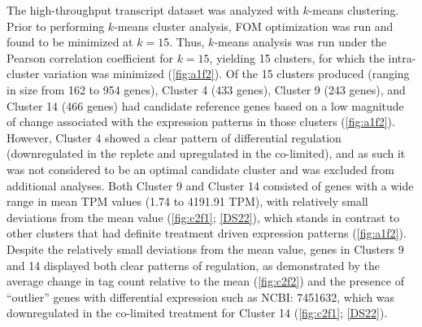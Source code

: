 The high-throughput transcript dataset was analyzed with $k$-means clustering. Prior to performing $k$-means cluster analysis, FOM optimization was run and found to be minimized at $k=1$5. Thus, $k$-means analysis was run under the Pearson correlation coefficient for $k=15$, yielding 15 clusters, for which the intra-cluster variation was minimized (\cref{fig:a1f2}). Of the 15 clusters produced (ranging in size from 162 to 954 genes), Cluster 4 (433 genes), Cluster 9 (243 genes), and Cluster 14 (466 genes) had candidate reference genes based on a low magnitude of change associated with the expression patterns in those clusters (\cref{fig:a1f2}). However, Cluster 4 showed a clear pattern of differential regulation (downregulated in the replete and upregulated in the co-limited), and as such it was not considered to be an optimal candidate cluster and was excluded from additional analyses. Both Cluster 9 and Cluster 14 consisted of genes with a wide range in mean TPM values (1.74 to 4191.91 TPM), with relatively small deviations from the mean value (\cref{fig:c2f1}; \ref{DS22}), which stands in contrast to other clusters that had definite treatment driven expression patterns (\cref{fig:a1f2}). Despite the relatively small deviations from the mean value, genes in Clusters 9 and 14 displayed both clear patterns of regulation, as demonstrated by the average change in tag count relative to the mean (\cref{fig:c2f2}) and the presence of ``outlier'' genes with differential expression such as NCBI: 7451632, which was downregulated in the co-limited treatment for Cluster 14 (\cref{fig:c2f1}; \ref{DS22}). \par

